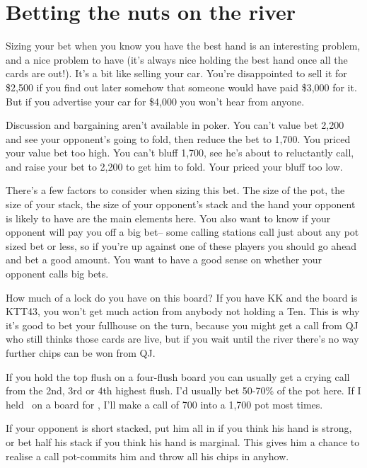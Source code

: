 \section{Betting the nuts on the river}

Sizing your bet when you know you have the best hand is an interesting problem,
and a nice problem to have (it's always nice holding the best hand once all
the cards are out!). It's a bit like selling your car. You're disappointed to
sell it for \$2,500 if you find out later somehow that someone would have paid
\$3,000 for it. But if you advertise your car for \$4,000 you won't hear from
anyone.

Discussion and bargaining aren't available in poker. You can't value
bet 2,200 and see your opponent's going to fold, then reduce
the bet to 1,700. You priced your value bet too high.
You can't bluff 1,700, see he's about to reluctantly call, and raise
your bet to 2,200 to get him to fold. Your priced your bluff too low.

There's a few factors to consider when sizing this bet. The size of the pot, the
size of your stack, the size of your opponent's stack and the hand your
opponent is likely to have are the main elements here. You also want to know
if your opponent will pay you off a big bet-- some calling stations call just
about any pot sized bet or less, so if you're up against one of these players
you should go ahead and bet a good amount. You want to have a good sense
on whether your opponent calls big bets.


How much of a lock do you have on this board? If you have KK and the
board is KTT43, you won't get much action from anybody not holding a Ten.
This is why it's good to bet your fullhouse on the turn, because you might
get a call from QJ who still thinks those cards are live, but if you wait
until the river there's no way further chips can be won from QJ.

If you hold the top flush on a four-flush board you can usually get a crying
call from the 2nd, 3rd or 4th highest flush. I'd usually bet 50-70\% of the
pot here. If I held \Jh\tens\ on a board for \Ah\tenh\nines\fiveh\fourh, I'll
make a call of 700 into a 1,700 pot most times.

If your opponent is short stacked, put him all in if you think his hand is
strong, or bet half his stack if you think his hand is marginal. This
gives him a chance to realise a call pot-commits him and throw all his
chips in anyhow.

